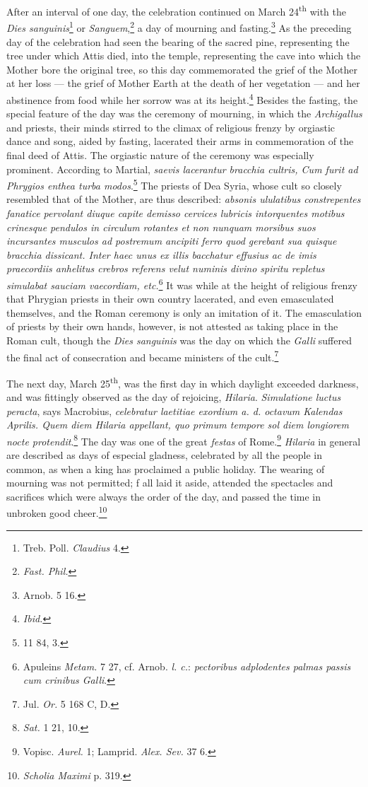 \documentclass[a4paper, 11pt, oneside, polutonikogreek, french]{article}
\begin{document}
After an interval of one day, the celebration continued on March 24\textsuperscript{th} with the \emph{Dies sanguinis}\footnote{Treb. Poll. \emph{Claudius} 4.} or \emph{Sanguem},\footnote{\emph{Fast. Phil.}} a day of mourning and fasting.\footnote{Arnob. 5 16.} As the preceding day of the celebration had seen the bearing of the sacred pine, representing the tree under which Attis died, into the temple, representing the cave into which the Mother bore the original tree, so this day commemorated the grief of the Mother at her loss --- the grief of Mother Earth at the death of her vegetation --- and her abstinence from food while her sorrow was at its height.\footnote{\emph{Ibid.}} Besides the fasting, the special feature of the day was the ceremony of mourning, in which the \emph{Archigallus} and priests, their minds stirred to the climax of religious frenzy by orgiastic dance and song, aided by fasting, lacerated their arms in commemoration of the final deed of Attis. The orgiastic nature of the ceremony was especially prominent. According to Martial, \emph{saevis lacerantur bracchia cultris, Cum furit ad Phrygios enthea turba modos}.\footnote{11 84, 3.} The priests of Dea Syria, whose cult so closely resembled that of the Mother, are thus described: \emph{absonis ululatibus constrepentes fanatice pervolant diuque capite demisso cervices lubricis intorquentes motibus crinesque pendulos in circulum rotantes et non nunquam morsibus suos incursantes musculos ad postremum ancipiti ferro quod gerebant sua quisque bracchia dissicant. Inter haec unus ex illis bacchatur effusius ac de imis praecordiis anhelitus crebros referens velut numinis divino spiritu repletus simulabat sauciam vaecordiam, etc.}\footnote{Apuleins \emph{Metam.} 7 27, cf. Arnob. \emph{l. c.}: \emph{pectoribus adplodentes palmas passis cum crinibus Galli}.} It was while at the height of religious frenzy that Phrygian priests in their own country lacerated, and even emasculated themselves, and the Roman ceremony is only an imitation of it. The emasculation of priests by their own hands, however, is not attested as taking place in the Roman cult, though the \emph{Dies sanguinis} was the day on which the \emph{Galli} suffered the final act of consecration and became ministers of the cult.\footnote{Jul. \emph{Or.} 5 168 C, D.}

The next day, March 25\textsuperscript{th}, was the first day in which daylight exceeded darkness, and was fittingly observed as the day of rejoicing, \emph{Hilaria}. \emph{Simulatione luctus peracta}, says Macrobius, \emph{celebratur laetitiae exordium a. d. octavum Kalendas Aprilis. Quem diem Hilaria appellant, quo primum tempore sol diem longiorem nocte protendit}.\footnote{\emph{Sat.} 1 21, 10.} The day was one of the great \emph{festas} of Rome.\footnote{Vopisc. \emph{Aurel.} 1; Lamprid. \emph{Alex. Sev.} 37 6.} \emph{Hilaria} in general are described as days of especial gladness, celebrated by all the people in common, as when a king has proclaimed a public holiday. The wearing of mourning was not permitted; f all laid it aside, attended the spectacles and sacrifices which were always the order of the day, and passed the time in unbroken good cheer.\footnote{\emph{Scholia Maximi} p. 319.}
\end{document}
